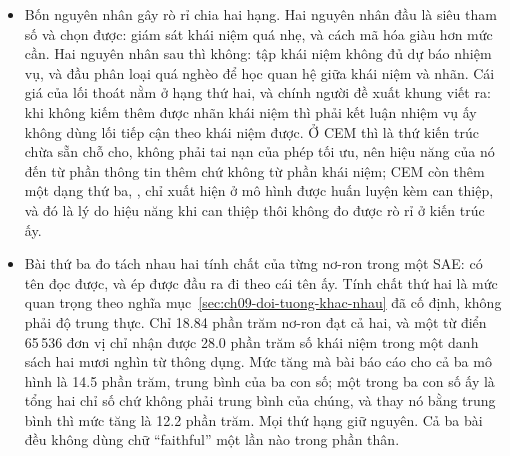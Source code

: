 \begin{tomtat}
\begin{itemize}
  \item Bốn nguyên nhân gây rò rỉ chia hai hạng. Hai nguyên nhân đầu là siêu
tham số và chọn được: giám sát khái niệm quá nhẹ, và cách mã hóa giàu hơn mức
cần. Hai nguyên nhân sau thì không: tập khái niệm không đủ dự báo nhiệm vụ, và
đầu phân loại quá nghèo để học quan hệ giữa khái niệm và nhãn. Cái giá của lối
thoát nằm ở hạng thứ hai, và chính người đề xuất khung viết ra: khi không kiếm
thêm được nhãn khái niệm thì phải kết luận nhiệm vụ ấy không dùng lối tiếp cận
theo khái niệm được. Ở CEM thì
 là thứ kiến trúc chừa sẵn
chỗ cho, không phải tai nạn của phép tối ưu, nên hiệu năng của nó đến từ phần
thông tin thêm chứ không từ phần khái niệm; CEM còn thêm một dạng thứ ba,
, chỉ xuất hiện ở mô hình được huấn luyện
kèm can thiệp, và đó là lý do hiệu năng khi can thiệp thôi không đo được rò rỉ ở
kiến trúc ấy.
  \item Bài thứ ba đo tách nhau hai tính chất của từng nơ-ron trong một SAE: có
tên đọc được, và ép được đầu ra đi theo cái tên ấy. Tính chất thứ hai là mức
quan trọng theo nghĩa mục~\ref{sec:ch09-doi-tuong-khac-nhau} đã cố định, không
phải độ trung thực. Chỉ 18.84 phần trăm nơ-ron đạt cả hai, và một từ điển
65\,536 đơn vị chỉ nhận được 28.0 phần trăm số khái niệm trong một danh sách hai
mươi nghìn từ thông dụng. Mức tăng  mà bài
báo cáo cho cả ba mô hình là 14.5 phần trăm, trung bình của ba con số; một trong
ba con số ấy là tổng hai chỉ số chứ không phải trung bình của chúng, và thay nó
bằng trung bình thì mức tăng là 12.2 phần trăm. Mọi thứ hạng giữ nguyên. Cả ba
bài đều không dùng chữ \enquote{faithful} một lần nào trong phần thân.
\end{itemize}
\end{tomtat}

